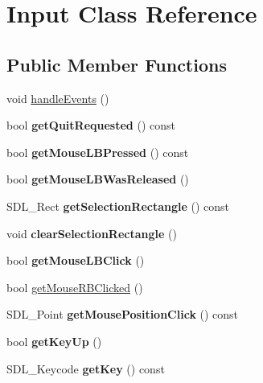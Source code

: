 \hypertarget{class_input}{}\section{Input Class Reference}
\label{class_input}
\subsection*{Public Member Functions}
\begin{DoxyCompactItemize}
\item 
void \hyperlink{class_input_a562550a18665e9eaee2a808c95999741}{handle\+Events} ()
\item 
\mbox{\label{class_input_a3be7291f12bc6a388fffd0ef838b19e8}} 
bool {\bfseries get\+Quit\+Requested} () const
\item 
\mbox{\label{class_input_a72a010d6f96fbc672e376675509766cf}} 
bool {\bfseries get\+Mouse\+L\+B\+Pressed} () const
\item 
\mbox{\label{class_input_afb1df1aa2bab914142454d6bf923bcca}} 
bool {\bfseries get\+Mouse\+L\+B\+Was\+Released} ()
\item 
\mbox{\label{class_input_aade1d077eaacc8521d554287c83ca949}} 
S\+D\+L\+\_\+\+Rect {\bfseries get\+Selection\+Rectangle} () const
\item 
\mbox{\label{class_input_a51bad6df89fef28220284320eff4fc6e}} 
void {\bfseries clear\+Selection\+Rectangle} ()
\item 
\mbox{\label{class_input_a60b5e6ce63aaa2095df36e0a6a64bac9}} 
bool {\bfseries get\+Mouse\+L\+B\+Click} ()
\item 
bool \hyperlink{class_input_a024c8cc30eeebab4bc3c81618e96b82b}{get\+Mouse\+R\+B\+Clicked} ()
\item 
\mbox{\label{class_input_a7dac7998056ac375b851ca996c38e41e}} 
S\+D\+L\+\_\+\+Point {\bfseries get\+Mouse\+Position\+Click} () const
\item 
\mbox{\label{class_input_a7e4e131a9deb4324027119cbd24b9b44}} 
bool {\bfseries get\+Key\+Up} ()
\item 
\mbox{\label{class_input_a48c879fea1d32d6ced0d6cef51a99b35}} 
S\+D\+L\+\_\+\+Keycode {\bfseries get\+Key} () const
\end{DoxyCompactItemize}



